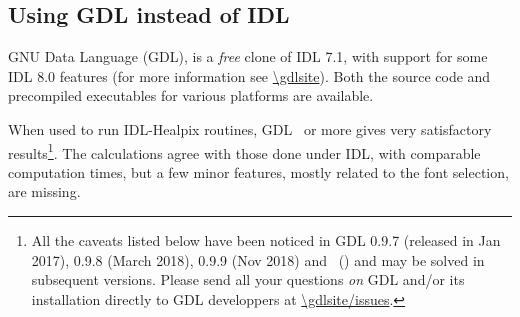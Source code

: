 \documentclass[12pt,twoside]{article}
\makeatletter
\newcommand{\nop}[1]{\Hy@raisedlink{\hypertarget{#1}{}}}
\newcommand{\mytarget}[1]{\nop{#1}}%
\newcommand{\mytarget}[1]{\label{#1}}
\makeatother
\begin{document}

\subsection{Using GDL instead of IDL}
\label{sec:using_gdl}
\label{install:using_gdl}
\mytarget{install:using_gdl}

GNU Data Language (GDL), is a {\em free} clone of IDL 7.1, with support for some IDL 8.0 features (for more information see
\url{\gdlsite}).
Both the source code and precompiled executables for various platforms are available.

When used to run IDL-Healpix routines, GDL \gdlversion\ or more gives
very satisfactory results\footnote{All the caveats listed below have been noticed in
GDL 0.9.7 (released in Jan 2017), 
0.9.8 (March 2018),
0.9.9 (Nov 2018) and 
\gdlversion\ (\gdlreldate) and may be solved in subsequent versions. Please send all your questions
{\em on} GDL and/or its installation directly to GDL developpers at 
\url{\gdlsite/issues}.}. 
The calculations agree with those done under IDL, with
comparable computation times, but a few minor features, mostly related to the font selection, are missing.
\end{document}
